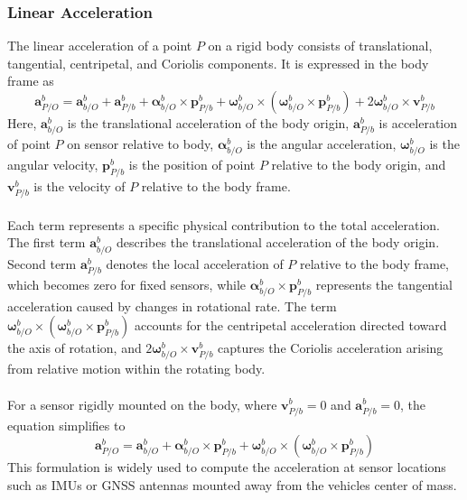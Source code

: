 \subsubsection{Linear Acceleration}
The linear acceleration of a point $P$ on a rigid body consists of translational, tangential, centripetal, and Coriolis components. It is expressed in the body frame as
$$
    \mathbf{a}_{P/O}^{b} =
    \mathbf{a}_{b/O}^{b}
    + \mathbf{a}_{P/b}^{b}
    + \boldsymbol{\alpha}_{b/O}^{b} \times \mathbf{p}_{P/b}^{b}
    + \boldsymbol{\omega}_{b/O}^{b} \times (\boldsymbol{\omega}_{b/O}^{b} \times \mathbf{p}_{P/b}^{b})
    + 2\boldsymbol{\omega}_{b/O}^{b} \times \mathbf{v}_{P/b}^{b}
$$
Here, $\mathbf{a}_{b/O}^{b}$ is the translational acceleration of the body origin, $\mathbf{a}_{P/b}^{b}$ is acceleration of point $P$ on sensor relative to body, $\boldsymbol{\alpha}_{b/O}^{b}$ is the angular acceleration, $\boldsymbol{\omega}_{b/O}^{b}$ is the angular velocity, $\mathbf{p}_{P/b}^{b}$ is the position of point $P$ relative to the body origin, and $\mathbf{v}_{P/b}^{b}$ is the velocity of $P$ relative to the body frame.  
\\ \\
Each term represents a specific physical contribution to the total acceleration. The first term $\mathbf{a}_{b/O}^{b}$ describes the translational acceleration of the body origin. Second term $\mathbf{a}_{P/b}^{b}$ denotes the local acceleration of $P$ relative to the body frame, which becomes zero for fixed sensors, while $\boldsymbol{\alpha}_{b/O}^{b} \times \mathbf{p}_{P/b}^{b}$ represents the tangential acceleration caused by changes in rotational rate. The term $\boldsymbol{\omega}_{b/O}^{b} \times (\boldsymbol{\omega}_{b/O}^{b} \times \mathbf{p}_{P/b}^{b})$ accounts for the centripetal acceleration directed toward the axis of rotation, and $2\boldsymbol{\omega}_{b/O}^{b} \times \mathbf{v}_{P/b}^{b}$ captures the Coriolis acceleration arising from relative motion within the rotating body.
\\ \\
For a sensor rigidly mounted on the body, where $\mathbf{v}_{P/b}^{b} = 0$ and $\mathbf{a}_{P/b}^{b} = 0$, the equation simplifies to  
$$
    \mathbf{a}_{P/O}^{b} =
    \mathbf{a}_{b/O}^{b}
    + \boldsymbol{\alpha}_{b/O}^{b} \times \mathbf{p}_{P/b}^{b}
    + \boldsymbol{\omega}_{b/O}^{b} \times (\boldsymbol{\omega}_{b/O}^{b} \times \mathbf{p}_{P/b}^{b})
$$
This formulation is widely used to compute the acceleration at sensor locations such as IMUs or GNSS antennas mounted away from the vehicles center of mass.  
